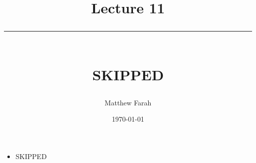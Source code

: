 \documentclass{article}
\date{
	\vspace{-.75em}
	{\large \today}
}
\title{
	\vspace*{-1.5em}
	{\Huge Lecture 11} \\
	\vspace{-1em}
	\rule{\textwidth/4}{.01em} \\
	\vspace{-.25em}
	{\Large SKIPPED}
	\vspace{-.75em}
}
\author{
	{\large Matthew Farah}
}
\begin{document}
\maketitle
\pagestyle{fancy}

\fi

\begin{itemize}
	\item SKIPPED
\end{itemize}

\ifdefined\iscombined
	\newpage
\else
	
\end{document}

